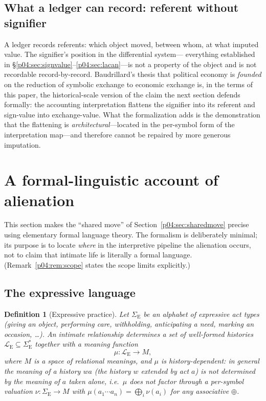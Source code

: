 \documentclass[11pt,a4paper]{article}
\newtheorem{definition}{Definition}
\newcommand{\LE}{\mathcal{L}_{\mathrm{E}}}
\newcommand{\SE}{\Sigma_{\mathrm{E}}}
\begin{document}
\subsection{What a ledger can record: referent without signifier}
\label{p04:sec:referent}
A ledger records referents: which object moved, between whom, at what
imputed value. The signifier's position in the differential system---
everything established in \S\ref{p04:sec:signvalue}--\ref{p04:sec:lacan}---is not a
property of the object and is not recordable record-by-record.
Baudrillard's thesis that political economy is \emph{founded} on the
reduction of symbolic exchange to economic exchange
\parencite{baudrillard1981} is, in the terms of this paper, the historical-scale
version of the claim the next section defends formally: the accounting
interpretation flattens the signifier into its referent and sign-value into
exchange-value. What the formalization adds is the demonstration that the
flattening is \emph{architectural}---located in the per-symbol form of the
interpretation map---and therefore cannot be repaired by more generous
imputation.

\section{A formal-linguistic account of alienation}
\label{p04:sec:formal}

This section makes the ``shared move'' of Section~\ref{p04:sec:sharedmove}
precise using elementary formal language theory. The formalism is deliberately
minimal; its purpose is to locate \emph{where} in the interpretive pipeline
the alienation occurs, not to claim that intimate life is literally a formal
language. (Remark~\ref{p04:rem:scope} states the scope limits explicitly.)

\subsection{The expressive language}
\begin{definition}[Expressive practice]
\label{p04:def:expressive}
Let $\SE$ be an alphabet of \emph{expressive act types} (giving an object,
performing care, withholding, anticipating a need, marking an occasion,
\ldots). An intimate relationship determines a set of well-formed
\emph{histories} $\LE \subseteq \SE^{*}$ together with a meaning function
\[
\mu : \LE \longrightarrow M,
\]
where $M$ is a space of relational meanings, and $\mu$ is
\emph{history-dependent}: in general the meaning of a history $wa$ (the
history $w$ extended by act $a$) is not determined by the meaning of $a$
taken alone, i.e.\ $\mu$ does not factor through a per-symbol valuation
$\nu:\SE \to M$ with $\mu(a_1\cdots a_n) = \bigoplus_i \nu(a_i)$ for any
associative $\oplus$.
\end{definition}
\end{document}
